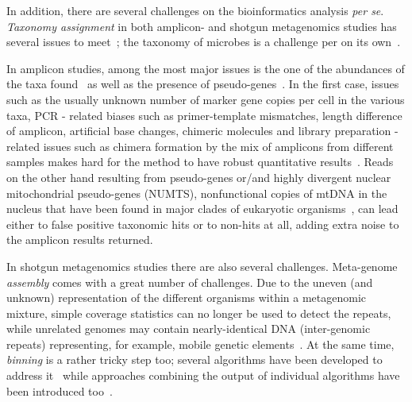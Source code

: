       In addition, there are several challenges on the bioinformatics analysis \textit{per se}.
      \textit{Taxonomy assignment} in both amplicon- and shotgun metagenomics studies 
      has several issues to meet~\citep{simon2019benchmarking};
      the taxonomy of microbes is a challenge per on its own~\citep{parks2020complete}.

      In amplicon studies, among the most major issues is the one of the abundances of the
      taxa found~\citep{fonseca2018pitfalls, balint2016millions} as well as the presence of pseudo-genes~\citep{song2008many}.
      In the first case, 
      issues such as  
      the usually unknown number of marker gene copies per cell in the various taxa,
      PCR - related biases such as primer-template mismatches, length difference of amplicon, artificial base changes, chimeric molecules 
      and library preparation - related issues such as chimera formation by the mix of amplicons from different samples
      makes hard for the method to have robust quantitative results~\citep{balint2016millions}. 
      Reads on the other hand resulting from pseudo-genes or/and highly divergent nuclear mitochondrial pseudo-genes (NUMTS), nonfunctional copies of mtDNA in the nucleus that have been found in major clades of eukaryotic organisms~\citep{bensasson2001mitochondrial}, 
      can lead either to false positive taxonomic hits or to non-hits at all,
      adding extra noise to the amplicon results returned.

      In shotgun metagenomics studies there are also several challenges. 
      Meta-genome \textit{assembly} comes with a great number of challenges. 
      Due to the uneven (and unknown) representation of the different organisms within a metagenomic mixture, simple coverage statistics can no longer be used to detect the repeats, while unrelated genomes may contain
      nearly-identical DNA (inter-genomic repeats) representing, for example, mobile genetic elements~\citep{ghurye2016focus}.
      At the same time, \textit{binning} is a rather tricky step too; 
      several algorithms have been developed to address it~\citep{yue2020evaluating}
      while approaches combining the output of individual algorithms have been introduced too~\citep{song2017binning_refiner}.


